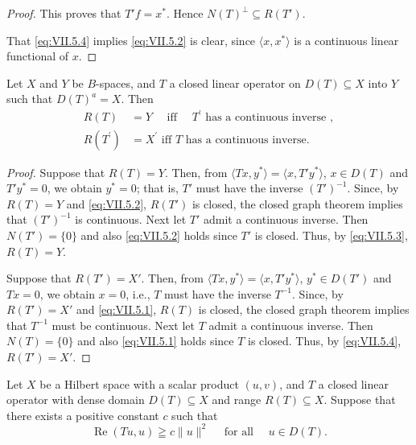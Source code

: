 \begin{proof}
This proves that $T'f = x^*$. Hence $N(T)^\perp \subseteq R(T')$. 

That \eqref{eq:VII.5.4} implies \eqref{eq:VII.5.2} is clear, since $\langle x, x^* \rangle$ is a continuous linear functional of $x$.
\end{proof}

\begin{corollary}\label{cor:VII.5.Corollary.1} Let $X$ and $Y$ be $B$-spaces, and $T$ a closed linear operator on $D(T) \subseteq X$ into $Y$ such that $D(T)^a = X$. Then 
\begin{align}
R (T)& = Y \quad \text{ iff } \quad T ^{\prime} \text{ has a continuous inverse }, \label{eq:VII.5.5} \\
R (T ^{\prime})& = X ^{\prime} \text{ iff } T \text{ has a continuous inverse. } \label{eq:VII.5.6}
\end{align}
\end{corollary}

\begin{proof}
 Suppose that $R(T) = Y$. Then, from $\langle Tx, y^* \rangle = \langle x, T'y^* \rangle$, $x \in D(T)$ and $T'y^* = 0$, we obtain $y^* = 0$; that is, $T'$ must have the inverse $(T')^{-1}$. Since, by $R(T) = Y$ and \eqref{eq:VII.5.2}, $R(T')$ is closed, the closed graph theorem implies that $(T')^{-1}$ is continuous. Next let $T'$ admit a continuous inverse. Then $N(T') = \{0\}$ and also \eqref{eq:VII.5.2} holds since $T'$ is closed. Thus, by \eqref{eq:VII.5.3}, $R(T) = Y$. 

Suppose that $R(T') = X'$. Then, from $\langle Tx, y^* \rangle = \langle x, T'y^* \rangle$, $y^* \in D(T')$ and $Tx = 0$, we obtain $x = 0$, i.e., $T$ must have the inverse $T^{-1}$. Since, by $R(T') = X'$ and \eqref{eq:VII.5.1}, $R(T)$ is closed, the closed graph theorem implies that $T^{-1}$ must be continuous. Next let $T$ admit a continuous inverse. Then $N(T) = \{0\}$ and also \eqref{eq:VII.5.1} holds since $T$ is closed. Thus, by \eqref{eq:VII.5.4}, $R(T') = X'$. 
\end{proof}

\begin{corollary}\label{cor:VII.5.Corollary.2} Let $X$ be a Hilbert space with a scalar product $(u, v)$, and $T$ a closed linear operator with dense domain $D(T) \subseteq X$ and range $R(T) \subseteq X$. Suppose that there exists a positive constant $c$ such that 
\begin{equation}\label{eq:VII.5.7}
\operatorname{Re} (T u, u) \geqq c \| u \| ^{2} \quad \text{ for all } \quad u \in D (T).
\end{equation}
\end{corollary}

